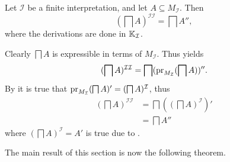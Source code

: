\begin{Lemma}
  \label{lem:double-II-gets-double-prime}
  Let $\mathcal{I}$ be a finite interpretation, and let $A \subseteq M_{\mathcal{I}}$.  Then
  \begin{equation*}
    (\bigsqcap A)^{\mathcal{I}\mathcal{I}} = \bigsqcap A'',
  \end{equation*}
  where the derivations are done in ${\mathbb{K}}_{\mathcal{I}}$.
\end{Lemma}
\begin{Proof}
  Clearly $\bigsqcap A$ is expressible in terms of $M_{\mathcal{I}}$.  Thus
   yields
  \begin{equation*}
    (\bigsqcap A)^{\mathcal{I}\mathcal{I}} = \bigsqcap(\operatorname{pr}_{M_{\mathcal{I}}}(\bigsqcap A))''.
  \end{equation*}
  By  it is true that $\operatorname{pr}_{M_{\mathcal{I}}}(\bigsqcap A)'
  = (\bigsqcap A)^{\mathcal{I}}$, thus
  \begin{align*}
    (\bigsqcap A)^{\mathcal{I}\mathcal{I}}
    &= \bigsqcap ((\bigsqcap A)^{\mathcal{I}})'\\
    &= \bigsqcap A''
  \end{align*}
  where $(\bigsqcap A)^{\mathcal{I}} = A'$ is true due to
  .
\end{Proof}

The main result of this section is now the following theorem.

